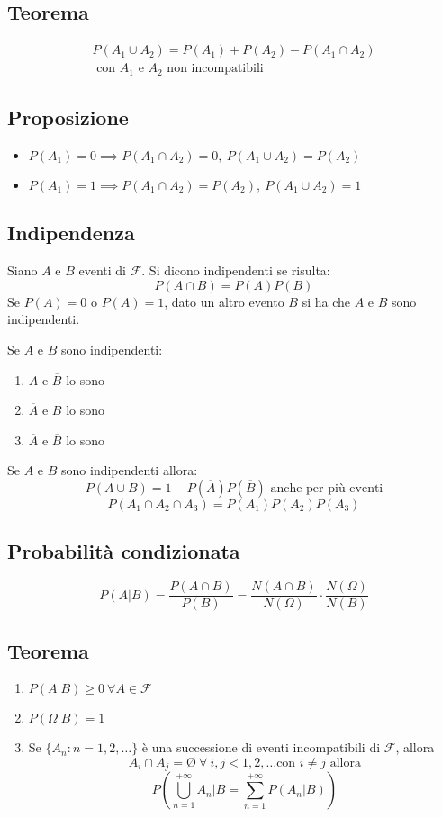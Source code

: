 \begin{multicols*}{2}
\subsection*{Teorema}
\begin{align*}
P(A_1 \cup A_2) = P(A_1) + P(A_2) - P(A_1 \cap A_2) \\\text{ con $A_1$ e $A_2$ non incompatibili}
\end{align*}

\subsection*{Proposizione}
\begin{itemize}
    \item $P(A_1) = 0 \implies P(A_1 \cap A_2) = 0, \ P(A_1 \cup A_2) = P(A_2)$
    \item $P(A_1) = 1 \implies P(A_1 \cap A_2) = P(A_2), \ P(A_1 \cup A_2) = 1$
\end{itemize}

\subsection*{Indipendenza}
Siano $A$ e $B$ eventi di $\mathscr{F}$. Si dicono indipendenti se risulta:
$$P(A \cap B) = P(A)P(B)$$
Se $P(A) = 0$ o $P(A) = 1$, dato un altro evento $B$ si ha che $A$ e $B$ sono indipendenti.

\smallbreak
Se $A$ e $B$ sono indipendenti:
\begin{enumerate}
    \item $A$ e $\overline{B}$ lo sono
    \item $\overline{A}$ e $B$ lo sono
    \item $\overline{A}$ e $\overline{B}$ lo sono
\end{enumerate}
Se $A$ e $B$ sono indipendenti allora:
$$P(A \cup B) = 1 - P(\overline{A})P(\overline{B})\text{ anche per più eventi}$$
$$P(A_1 \cap A_2 \cap A_3) = P(A_1)P(A_2)P(A_3)$$

\subsection*{Probabilità condizionata}
$$
P(A|B) = \frac{P(A \cap B)}{P(B)} = \frac{N(A \cap B)}{N(\Omega)} \cdot \frac{N(\Omega)}{N(B)}
$$

\subsection*{Teorema}
\begin{enumerate}
    \item $P(A|B) \ge 0 \ \forall A \in \mathscr{F}$
    \item $P(\Omega | B) = 1$
    \item Se $\{A_n: n = 1,2,\dots\}$ è una successione di eventi
    incompatibili di $\mathscr{F}$, allora
    $$A_i \cap A_j = \text{\O} \ \forall \ i,j < 1,2,\dots \text{con } i \neq j \text{ allora}$$
    $$P \left(\bigcup^{+\infty}_{n=1} A_n | B = \sum_{n=1}^{+\infty}P(A_n | B) \right)$$
\end{enumerate}


\end{multicols*}
